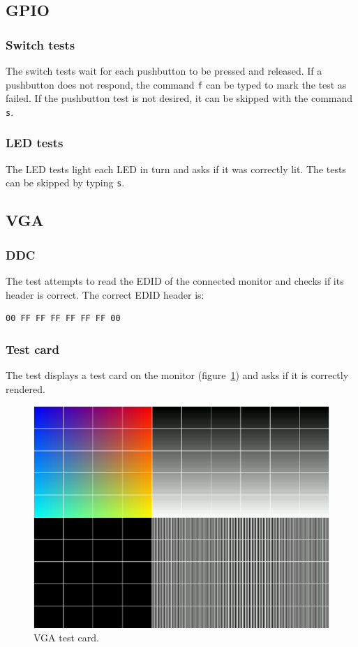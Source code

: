 \documentclass[a4paper,11pt]{article}
\begin{document}
\subsection{GPIO}
\subsubsection{Switch tests}
The switch tests wait for each pushbutton to be pressed and released. If a pushbutton does not respond, the command \verb!f! can be typed to mark the test as failed. If the pushbutton test is not desired, it can be skipped with the command \verb!s!.

\subsubsection{LED tests}
The LED tests light each LED in turn and asks if it was correctly lit. The tests can be skipped by typing \verb!s!.

\subsection{VGA}
\subsubsection{DDC}
The test attempts to read the EDID of the connected monitor and checks if its header is correct. The correct EDID header is:
\begin{verbatim}
00 FF FF FF FF FF FF 00
\end{verbatim}

\subsubsection{Test card}
The test displays a test card on the monitor (figure~\ref{testcard}) and asks if it is correctly rendered.

\begin{figure}
\centering
\includegraphics[width=\textwidth]{testcard.eps}
\caption{VGA test card.} \label{testcard}
\end{figure}
\end{document}
